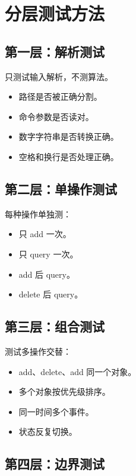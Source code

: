 \section{分层测试方法}\label{sec:07-32}

\subsection{第一层：解析测试}

只测试输入解析，不测算法。

\begin{itemize}
  \item 路径是否被正确分割。
  \item 命令参数是否读对。
  \item 数字字符串是否转换正确。
  \item 空格和换行是否处理正确。
\end{itemize}

\subsection{第二层：单操作测试}

每种操作单独测：

\begin{itemize}
  \item 只 add 一次。
  \item 只 query 一次。
  \item add 后 query。
  \item delete 后 query。
\end{itemize}

\subsection{第三层：组合测试}

测试多操作交替：

\begin{itemize}
  \item add、delete、add 同一个对象。
  \item 多个对象按优先级排序。
  \item 同一时间多个事件。
  \item 状态反复切换。
\end{itemize}

\subsection{第四层：边界测试}

